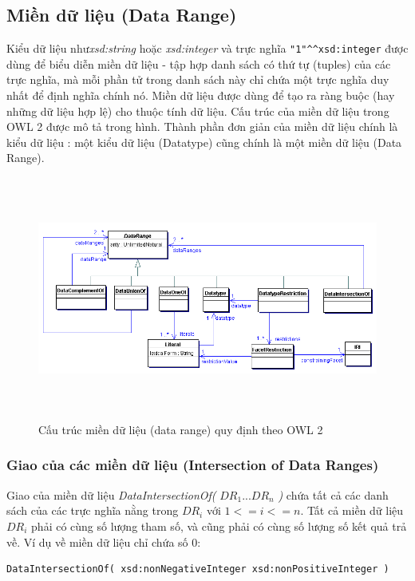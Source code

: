 \subsection{Miền dữ liệu (Data Range)}
Kiểu dữ liệu như\textit{xsd:string} hoặc \textit{xsd:integer} và trực nghĩa \verb|"1"^^xsd:integer| được dùng để biểu diễn miền dữ liệu - tập hợp danh sách có thứ tự (tuples) của các trực nghĩa, mà mỗi phần tử trong danh sách này chỉ chứa một trực nghĩa duy nhất để định nghĩa chính nó. Miền dữ liệu được dùng để tạo ra ràng buộc (hay những dữ liệu hợp lệ) cho thuộc tính dữ liệu. Cấu trúc của miền dữ liệu trong OWL 2 được mô tả trong hình. Thành phần đơn giản của miền dữ liệu chính là kiểu dữ liệu : một kiểu dữ liệu (Datatype) cũng chính là một miền dữ liệu (Data Range).
\begin{figure}[h!]
	\centering
	\includegraphics[width=150mm, height=80mm]{Figures/datarange.png}
	\caption{Cấu trúc miền dữ liệu (data range) quy định theo OWL 2\label{overflow}}
\end{figure}

\subsubsection{Giao của các miền dữ liệu (Intersection of Data Ranges)}
Giao của miền dữ liệu \textit{DataIntersectionOf(} $DR_{1} ... DR_{n}$ \textit{)}  chứa tất cả các danh sách của các trực nghĩa nằng trong $DR_{i}$ với $1 <= i <= n$. Tất cả miền dữ liệu $DR_{i}$ phải có cùng số lượng tham số, và cũng phải có cùng số lượng số kết quả trả về. Ví dụ về miền dữ liệu chỉ chứa số 0:
\begin{verbatim}
DataIntersectionOf( xsd:nonNegativeInteger xsd:nonPositiveInteger )
\end{verbatim}


